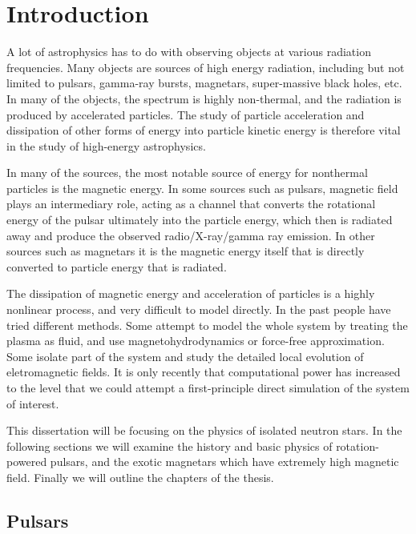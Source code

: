 
\chapter{Introduction}
\label{chap:intro}

A lot of astrophysics has to do with observing objects at various radiation
frequencies. Many objects are sources of high energy radiation, including but
not limited to pulsars, gamma-ray bursts, magnetars, super-massive black holes,
etc. In many of the objects, the spectrum is highly non-thermal, and the
radiation is produced by accelerated particles. The study of particle
acceleration and dissipation of other forms of energy into particle kinetic
energy is therefore vital in the study of high-energy astrophysics.

In many of the sources, the most notable source of energy for nonthermal
particles is the magnetic energy. In some sources such as pulsars, magnetic
field plays an intermediary role, acting as a channel that converts the
rotational energy of the pulsar ultimately into the particle energy, which then
is radiated away and produce the observed radio/X-ray/gamma ray emission. In
other sources such as magnetars it is the magnetic energy itself that is
directly converted to particle energy that is radiated.

The dissipation of magnetic energy and acceleration of particles is a highly
nonlinear process, and very difficult to model directly. In the past people have
tried different methods. Some attempt to model the whole system by treating the
plasma as fluid, and use magnetohydrodynamics or force-free approximation. Some
isolate part of the system and study the detailed local evolution of
eletromagnetic fields. It is only recently that computational power has
increased to the level that we could attempt a first-principle direct simulation
of the system of interest.

This dissertation will be focusing on the physics of isolated neutron stars. In
the following sections we will examine the history and basic physics of
rotation-powered pulsars, and the exotic magnetars which have extremely high
magnetic field. Finally we will outline the chapters of the thesis.

\section{Pulsars}
\label{sec:intro-pulsars}

